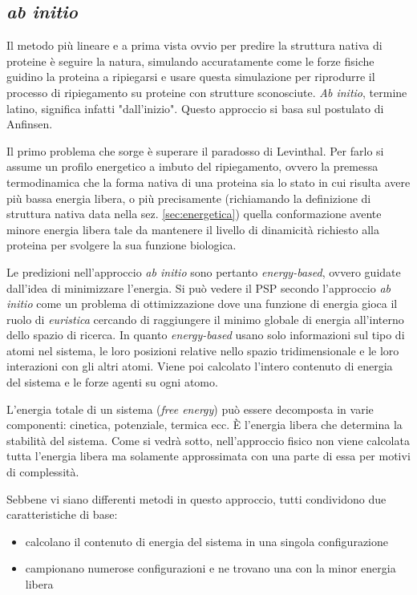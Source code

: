 \subsection{\textit{ab initio}}
{
Il metodo più lineare e a prima vista ovvio per predire la struttura nativa di proteine è seguire la natura, simulando accuratamente come le forze fisiche guidino la proteina a ripiegarsi e usare questa simulazione per riprodurre il processo di ripiegamento su proteine con strutture sconosciute. \textit{Ab initio}, termine latino, significa infatti "dall'inizio". Questo approccio si basa sul postulato di Anfinsen.

\par Il primo problema che sorge è superare il paradosso di Levinthal. Per farlo si assume un profilo energetico a imbuto del ripiegamento, ovvero la premessa termodinamica che la forma nativa di una proteina sia lo stato in cui risulta avere più bassa energia libera, o più precisamente (richiamando la definizione di struttura nativa data nella sez. \ref{sec:energetica}) quella conformazione avente minore energia libera tale da mantenere il livello di dinamicità richiesto alla proteina per svolgere la sua funzione biologica.

\par Le predizioni nell'approccio \textit{ab initio} sono pertanto \textit{energy-based}, ovvero guidate dall'idea di minimizzare l'energia. Si può vedere il PSP secondo l'approccio \textit{ab initio} come un problema di ottimizzazione dove una funzione di energia gioca il ruolo di \textit{euristica} cercando di raggiungere il minimo globale di energia all'interno dello spazio di ricerca. In quanto \textit{energy-based} usano solo informazioni sul tipo di atomi nel sistema, le loro posizioni relative nello spazio tridimensionale e le loro interazioni con gli altri atomi. Viene poi calcolato l'intero contenuto di energia del sistema e le forze agenti su ogni atomo. 

\par L'energia totale di un sistema (\textit{free energy}) può essere decomposta in varie componenti: cinetica, potenziale, termica ecc. È l'energia libera che determina la stabilità del sistema. Come si vedrà sotto, nell'approccio fisico non viene calcolata tutta l'energia libera ma solamente approssimata con una parte di essa per motivi di complessità.

\par Sebbene vi siano differenti metodi in questo approccio, tutti condividono due caratteristiche di base:
\begin{itemize}
	\item calcolano il contenuto di energia del sistema in una singola configurazione
	\item campionano numerose configurazioni e ne trovano una con la minor energia libera
\end{itemize}

}
